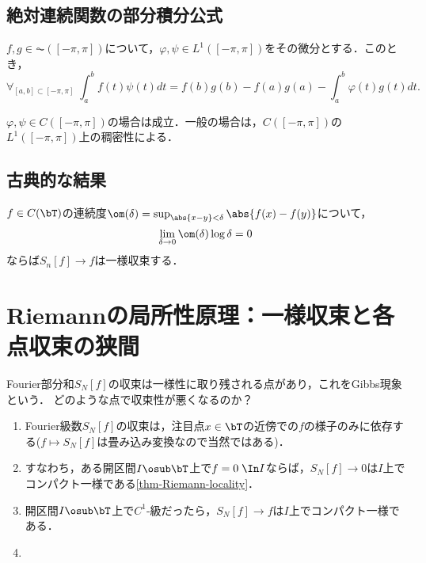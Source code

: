 \documentclass[uplatex,dvipdfmx]{jsreport}
\begin{document}
\subsection{絶対連続関数の部分積分公式}

\begin{lemma}\label{lemma-partial-integral-law}
    $f,g\in\AC([-\pi,\pi])$について，$\varphi,\psi\in L^1([-\pi,\pi])$をその微分とする．このとき，
    \[\forall_{[a,b]\subset[-\pi,\pi]}\;\int^b_af(t)\psi(t)dt=f(b)g(b)-f(a)g(a)-\int^b_a\varphi(t)g(t)dt.\]
\end{lemma}
\begin{Proof}
    $\varphi,\psi\in C([-\pi,\pi])$の場合は成立．一般の場合は，$C([-\pi,\pi])$の$L^1([-\pi,\pi])$上の稠密性による．
\end{Proof}

\subsection{古典的な結果}

\begin{corollary}
    $f\in C(\bT)$の連続度$\om(\delta)=\sup_{\abs{x-y}<\delta}\abs{f(x)-f(y)}$について，
    \[\lim_{\delta\to0}\om(\delta)\log\delta=0\]
    ならば$S_n[f]\to f$は一様収束する．
\end{corollary}

\section{Riemannの局所性原理：一様収束と各点収束の狭間}

\begin{tcolorbox}[colframe=ForestGreen, colback=ForestGreen!10!white,breakable,colbacktitle=ForestGreen!40!white,coltitle=black,fonttitle=\bfseries\sffamily,
    title=]
    Fourier部分和$S_N[f]$の収束は一様性に取り残される点があり，これをGibbs現象という．
    どのような点で収束性が悪くなるのか？
    \begin{enumerate}
        \item Fourier級数$S_N[f]$の収束は，注目点$x\in\bT$の近傍での$f$の様子のみに依存する($f\mapsto S_N[f]$は畳み込み変換なので当然ではある)．
        \item すなわち，ある開区間$I\osub\bT$上で$f=0\;\In I$ならば，$S_N[f]\to 0$は$I$上でコンパクト一様である\ref{thm-Riemann-locality}．
        \item 開区間$I\osub\bT$上で$C^1$-級だったら，$S_N[f]\to f$は$I$上でコンパクト一様である．
        \item 
    \end{enumerate}
\end{tcolorbox}    
\end{document}
